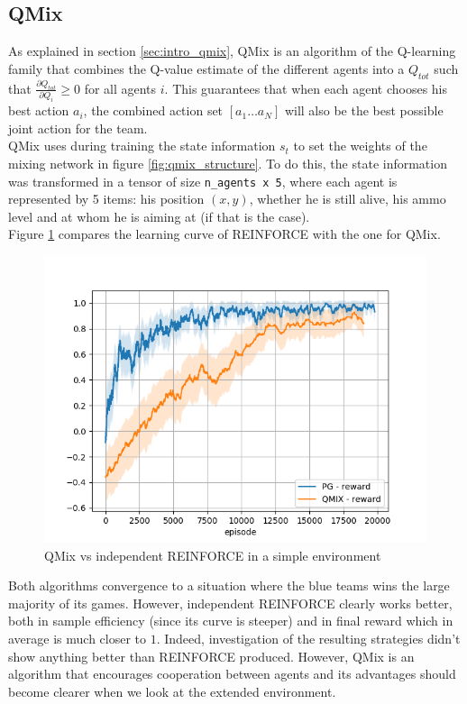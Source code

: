 \subsection{QMix}
\label{sec:init_model_qmix}
As explained in section \ref{sec:intro_qmix}, QMix is an algorithm of the Q-learning family that combines the Q-value estimate of the different agents into a $Q_{tot}$ such that $\frac{\partial Q_{tot}}{\partial Q_i} \geq 0$ for all agents $i$. This guarantees that when each agent chooses his best action $a_i$, the combined action set $[a_1 \ldots a_N]$ will also be the best possible joint action for the team.\\
QMix uses during training the state information $s_t$ to set the weights of the mixing network in figure \ref{fig:qmix_structure}. To do this, the state information was transformed in a tensor of size {\tt n\_agents x 5}, where each agent is represented by 5 items: his position $(x, y)$, whether he is still alive, his ammo level and at whom he is aiming at (if that is the case).\\
Figure \ref{fig:comp_qmix_pg} compares the learning curve of REINFORCE with the one for QMix.
\begin{figure}[htp]
    \centering
    \includegraphics[width=14cm]{images/experiment5/pg_v_qmix_simple.png}
    \caption{QMix vs independent REINFORCE in a simple environment}
    \label{fig:comp_qmix_pg}
\end{figure}
Both algorithms convergence to a situation where the blue teams wins the large majority of its games. However, independent REINFORCE clearly works better, both in sample efficiency (since its curve is steeper) and in final reward which in average is much closer to $1$. Indeed, investigation of the resulting strategies didn't show anything better than REINFORCE produced. However, QMix is an algorithm that encourages cooperation between agents and its advantages should become clearer when we look at the extended environment.\\
